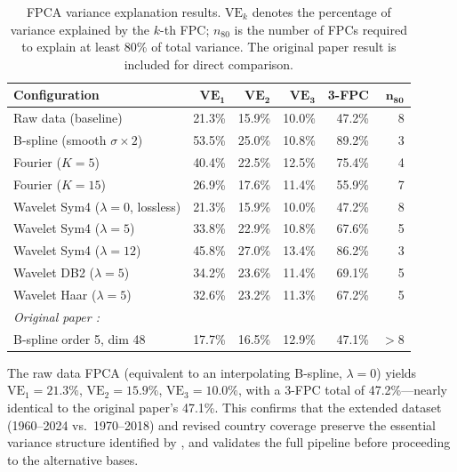 \begin{table}[H]
\centering
\caption{FPCA variance explanation results. $\mathrm{VE}_k$ denotes the percentage
of variance explained by the $k$-th FPC; $n_{80}$ is the number of FPCs required
to explain at least 80\% of total variance. The original paper result is included
for direct comparison.}
\label{tab:fpca_summary}
\begin{tabular}{lrrrrr}
\hline
\textbf{Configuration} & $\mathrm{\mathbf{VE_1}}$ & $\mathrm{\mathbf{VE_2}}$
    & $\mathrm{\mathbf{VE_3}}$ & \textbf{3-FPC} & $\mathbf{n_{80}}$ \\
\hline
Raw data (baseline)                    & 21.3\% & 15.9\% & 10.0\% & 47.2\% & 8 \\
B-spline (smooth $\sigma\!\times\!2$)  & 53.5\% & 25.0\% & 10.8\% & 89.2\% & 3 \\
Fourier ($K = 5$)                      & 40.4\% & 22.5\% & 12.5\% & 75.4\% & 4 \\
Fourier ($K = 15$)                     & 26.9\% & 17.6\% & 11.4\% & 55.9\% & 7 \\
Wavelet Sym4 ($\lambda = 0$, lossless) & 21.3\% & 15.9\% & 10.0\% & 47.2\% & 8 \\
Wavelet Sym4 ($\lambda = 5$)           & 33.8\% & 22.9\% & 10.8\% & 67.6\% & 5 \\
Wavelet Sym4 ($\lambda = 12$)          & 45.8\% & 27.0\% & 13.4\% & 86.2\% & 3 \\
Wavelet DB2  ($\lambda = 5$)           & 34.2\% & 23.6\% & 11.4\% & 69.1\% & 5 \\
Wavelet Haar ($\lambda = 5$)           & 32.6\% & 23.2\% & 11.3\% & 67.2\% & 5 \\
\hline
\multicolumn{6}{l}{\textit{Original paper \cite{padilla2020}:}} \\
B-spline order 5, dim 48               & 17.7\% & 16.5\% & 12.9\% & 47.1\% & $>8$ \\
\hline
\end{tabular}
\end{table}

The raw data FPCA (equivalent to an interpolating B-spline, $\lambda = 0$)
yields $\mathrm{VE_1} = 21.3\%$, $\mathrm{VE_2} = 15.9\%$,
$\mathrm{VE_3} = 10.0\%$, with a 3-FPC total of 47.2\%---nearly identical to
the original paper's 47.1\%. This confirms that the extended dataset (1960--2024
vs.\ 1970--2018) and revised country coverage preserve the essential variance
structure identified by \cite{padilla2020}, and validates the full pipeline
before proceeding to the alternative bases.

